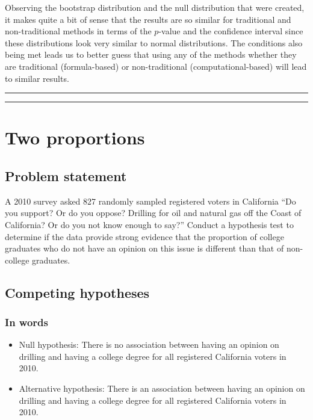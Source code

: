\documentclass[12pt,]{krantz}
\theoremstyle{definition}
\theoremstyle{definition}
\theoremstyle{definition}
\theoremstyle{remark}
\begin{document}
Observing the bootstrap distribution and the null distribution that were
created, it makes quite a bit of sense that the results are so similar
for traditional and non-traditional methods in terms of the \(p\)-value
and the confidence interval since these distributions look very similar
to normal distributions. The conditions also being met leads us to
better guess that using any of the methods whether they are traditional
(formula-based) or non-traditional (computational-based) will lead to
similar results.

\begin{center}\rule{0.5\linewidth}{\linethickness}\end{center}

\begin{center}\rule{0.5\linewidth}{\linethickness}\end{center}

\section{Two proportions}\label{two-proportions}

\subsection{Problem statement}\label{problem-statement-2}

A 2010 survey asked 827 randomly sampled registered voters in California
``Do you support? Or do you oppose? Drilling for oil and natural gas off
the Coast of California? Or do you not know enough to say?'' Conduct a
hypothesis test to determine if the data provide strong evidence that
the proportion of college graduates who do not have an opinion on this
issue is different than that of non-college graduates. \citep[Tweaked a
bit from][ {[}Chapter 6{]}]{isrs2014}

\subsection{Competing hypotheses}\label{competing-hypotheses-2}

\subsubsection*{In words}\label{in-words-2}


\begin{itemize}
\item
  Null hypothesis: There is no association between having an opinion on
  drilling and having a college degree for all registered California
  voters in 2010.
\item
  Alternative hypothesis: There is an association between having an
  opinion on drilling and having a college degree for all registered
  California voters in 2010.
\end{itemize}
\end{document}
